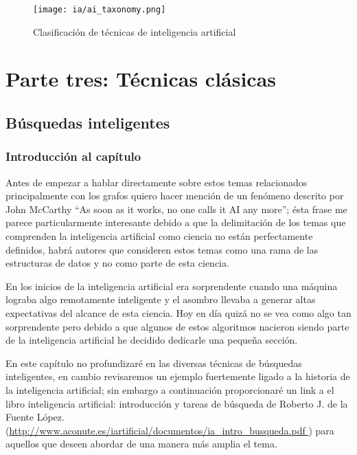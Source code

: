 \documentclass[11pt,fleqn]{book} %
\begin{document}
\begin{figure}[ht]
\centering\texttt{[image: ia/ai\_taxonomy.png]}
\caption{Clasificación de técnicas de inteligencia artificial}
\label{fig:ai_taxonomy} 
\end{figure}

\part{Parte tres: Técnicas clásicas}



\chapter{Búsquedas inteligentes}

\section{Introducción al capítulo}

Antes de empezar a hablar directamente sobre estos temas relacionados principalmente con los grafos quiero hacer mención de un fenómeno descrito por John McCarthy “As soon as it works, no one calls it AI any more”; ésta frase me parece particularmente interesante debido a que la delimitación de los temas que comprenden la inteligencia artificial como ciencia no están perfectamente definidos, habrá autores que consideren estos temas como una rama de las estructuras de datos y no como parte de esta ciencia.

En los inicios de la inteligencia artificial era sorprendente cuando una máquina lograba algo remotamente inteligente y el asombro llevaba a generar altas expectativas del alcance de esta ciencia. Hoy en día quizá no se vea como algo tan sorprendente pero debido a que algunos de estos algoritmos nacieron siendo parte de la inteligencia artificial he decidido dedicarle una pequeña sección.

En este capítulo no profundizaré en las diversas técnicas de búsquedas inteligentes, en cambio revisaremos un ejemplo fuertemente ligado a la historia de la inteligencia artificial; sin embargo a continuación proporcionaré un link a el libro inteligencia artificial: introducción y tareas de búsqueda de Roberto J. de la Fuente López. (\url{http://www.aconute.es/iartificial/documentos/ia_intro_busqueda.pdf }) para aquellos que deseen abordar de una manera más amplia el tema.
\end{document}
